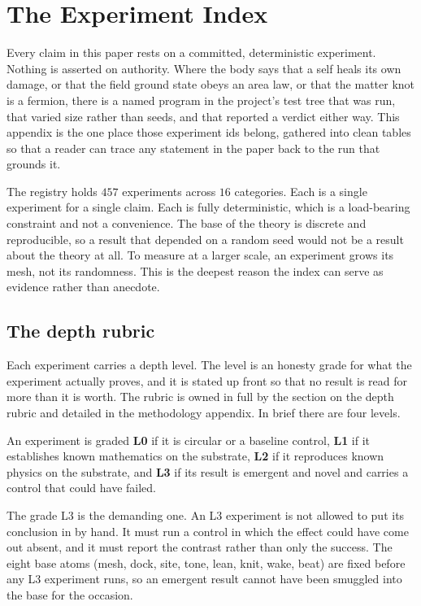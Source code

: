 \section{The Experiment Index}

Every claim in this paper rests on a committed, deterministic experiment. Nothing is asserted on authority. Where the body says that a self heals its own damage, or that the field ground state obeys an area law, or that the matter knot is a fermion, there is a named program in the project's test tree that was run, that varied size rather than seeds, and that reported a verdict either way. This appendix is the one place those experiment ids belong, gathered into clean tables so that a reader can trace any statement in the paper back to the run that grounds it.

The registry holds $457$ experiments across $16$ categories. Each is a single experiment for a single claim. Each is fully deterministic, which is a load-bearing constraint and not a convenience. The base of the theory is discrete and reproducible, so a result that depended on a random seed would not be a result about the theory at all. To measure at a larger scale, an experiment grows its mesh, not its randomness. This is the deepest reason the index can serve as evidence rather than anecdote.

\subsection{The depth rubric}

Each experiment carries a depth level. The level is an honesty grade for what the experiment actually proves, and it is stated up front so that no result is read for more than it is worth. The rubric is owned in full by the section on the depth rubric and detailed in the methodology appendix. In brief there are four levels.

\begin{definition}
An experiment is graded \textbf{L0} if it is circular or a baseline control, \textbf{L1} if it establishes known mathematics on the substrate, \textbf{L2} if it reproduces known physics on the substrate, and \textbf{L3} if its result is emergent and novel and carries a control that could have failed.
\end{definition}

The grade L3 is the demanding one. An L3 experiment is not allowed to put its conclusion in by hand. It must run a control in which the effect could have come out absent, and it must report the contrast rather than only the success. The eight base atoms (mesh, dock, site, tone, lean, knit, wake, beat) are fixed before any L3 experiment runs, so an emergent result cannot have been smuggled into the base for the occasion.

